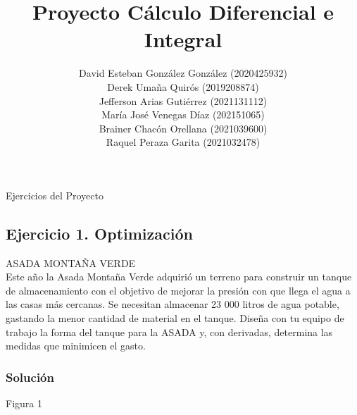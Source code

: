 \documentclass[stu, 12pt, letterpaper, donotrepeattitle, floatsintext, natbib]{apa7}
\title{\Large Proyecto Cálculo Diferencial e Integral}
\author{David Esteban González González (2020425932) \\Derek Umaña Quirós
(2019208874) \\Jefferson Arias Gutiérrez (2021131112)\\María José Venegas Díaz 
(202151065)\\Brainer Chacón Orellana (2021039600)\\Raquel Peraza Garita (2021032478)} %
\affiliation{Instituto Tecnológico de Costa Rica}
\begin{document}
\maketitle
\renewcommand\contentsname{\largeÍndice}
\tableofcontents
\setcounter{tocdepth}{2}
\newpage
\renewcommand{\listfigurename}{\largeÍndice de fíguras}
\listoffigures
\newpage
\renewcommand{\listtablename}{\largeÍndice de tablas}
\listoftables
\newpage


\renewcommand\refname{\large\textbf{Referencias}}
{\large Ejercicios del Proyecto}
    \subsection{Ejercicio 1. Optimización}
        ASADA MONTAÑA VERDE\\
        Este año la Asada Montaña Verde adquirió un terreno para construir un tanque de almacenamiento
        con el objetivo de mejorar la presión con que llega el agua a las casas más cercanas.
        Se necesitan almacenar 23 000 litros de agua potable, gastando la menor cantidad de material
        en el tanque. Diseña con tu equipo de trabajo la forma del tanque para la ASADA y,
        con derivadas, determina las medidas que minimicen el gasto.
        \subsubsection{Solución}
        \begin{multicols}{2}
                \caption{Figura 1}
                
        \end{multicols}

\newpage
\end{document}
